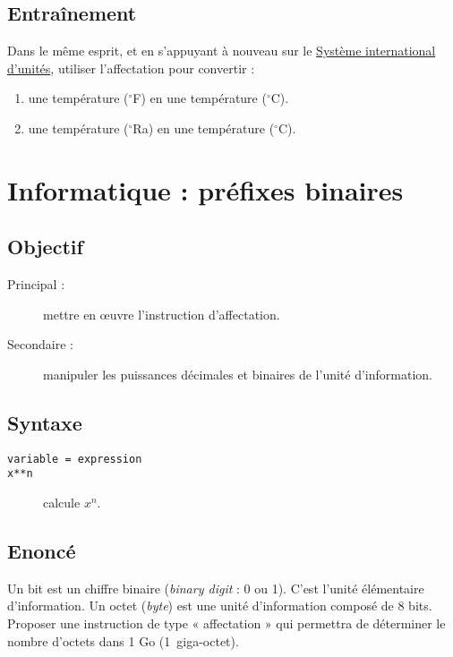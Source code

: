 \subsection{Entraînement}\label{affectation:physique:entrainement}
Dans le même esprit, et en s'appuyant à nouveau sur le 
\href{http://www.bipm.org/fr/si/}{Système international d'unités}, 
utiliser l'affectation pour convertir :
\begin{enumerate}
\item une température  ($^\circ$F) en une température  ($^\circ$C).
\item une température  ($^\circ$Ra) en une température  	($^\circ$C).
\end{enumerate}

\section{Informatique : préfixes binaires}\label{affectation:informatique}

\subsection{Objectif}\label{affectation:informatique:objectif}
\begin{description}
\item[Principal : ] mettre en \oe uvre l'instruction d'affectation.
\item[Secondaire :] manipuler les puissances décimales et binaires de l'unité d'information.
\end{description}

\subsection{Syntaxe \python}\label{affectation:informatique:python}
\begin{description}
\item[\texttt{variable = expression}]\mbox{}
\item[\texttt{x**n}] calcule $x^n$.
\end{description}

\subsection{Enoncé}\label{affectation:informatique:enonce}
Un bit est un chiffre binaire (\emph{binary digit} : 0 ou 1). 
C'est l'unité élémentaire d'information. 
Un octet (\emph{byte}) est une unité d'information composé de 8 bits.\\
Proposer une instruction de type « affectation » qui permettra de déterminer 
le nombre d'octets dans 1 Go (1~giga-octet).


